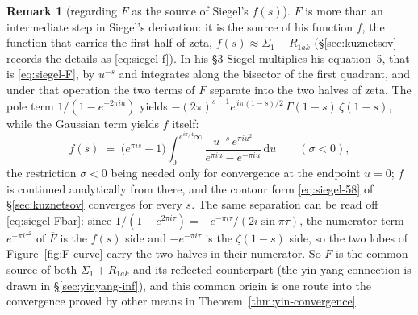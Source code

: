 \documentclass[11pt]{article}
\theoremstyle{definition}
\newtheorem{remark}[theorem]{Remark}
\begin{document}
\begin{remark}[regarding $F$ as the source of Siegel's $f(s)$]\label{rem:F-to-f}
$F$ is more than an intermediate step in Siegel's derivation: it is the
source of his function $f$, the function that carries the first half of
zeta, $f(s)\approx\Sigma_1+R_{1ak}$ (\S\ref{sec:kuznetsov} records the
details as \eqref{eq:siegel-f}). In his \S3 Siegel multiplies his
equation~5, that is \eqref{eq:siegel-F}, by $u^{-s}$ and integrates along
the bisector of the first quadrant, and under that operation the two
terms of $F$ separate into the two halves of zeta. The pole term
$1/(1-e^{-2\pi iu})$ yields
$-(2\pi)^{s-1}e^{\,i\pi(1-s)/2}\,\Gamma(1-s)\,\zeta(1-s)$, while the
Gaussian term yields $f$ itself:
\begin{equation}\label{eq:f-from-F}
f(s)\;=\;\bigl(e^{\pi i s}-1\bigr)
\int_{0}^{e^{i\pi/4}\infty}
\frac{u^{-s}\,e^{\pi i u^{2}}}{e^{\pi i u}-e^{-\pi i u}}\,\mathrm{d}u
\qquad (\sigma<0),
\end{equation}
the restriction $\sigma<0$ being needed only for convergence at the
endpoint $u=0$; $f$ is continued analytically from there, and the contour
form \eqref{eq:siegel-58} of \S\ref{sec:kuznetsov} converges for every
$s$. The same separation can be read off \eqref{eq:siegel-Fbar}: since
$1/(1-e^{2\pi i\tau})=-e^{-\pi i\tau}/(2i\sin\pi\tau)$, the numerator
term $e^{-\pi i\tau^{2}}$ of $\overline{F}$ is the $f(s)$ side and
$-e^{-\pi i\tau}$ is the $\zeta(1-s)$ side, so the two lobes of
Figure~\ref{fig:F-curve} carry the two halves in their numerator. So $F$
is the common source of both $\Sigma_1+R_{1ak}$ and its reflected
counterpart (the yin-yang connection is drawn in
\S\ref{sec:yinyang-inf}), and this common origin is one route into the
convergence proved by other means in Theorem~\ref{thm:yin-convergence}.
\end{remark}
\end{document}
